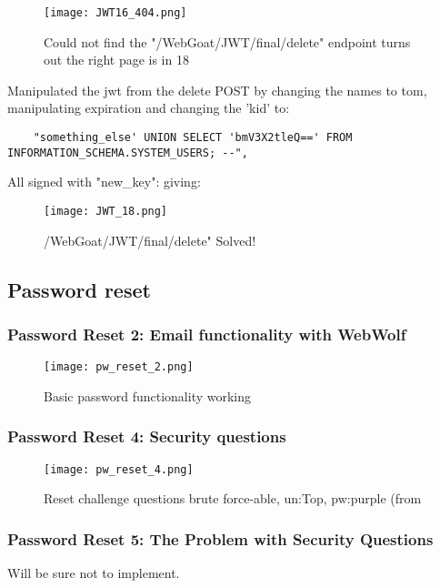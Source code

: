 \documentclass[
	letterpaper, %
	10pt, %
	unnumberedsections, %
	twoside, %
]{APAAssignment}
\begin{document}
\begin{appendices}
\begin{figure}[!ht] %
	\centering
	\texttt{[image: JWT16\_404.png]}
	\caption{Could not find the "/WebGoat/JWT/final/delete" endpoint turns out the right page is in 18}
	\label{fig:app:JWT16}
\end{figure}

Manipulated the jwt from the delete POST by changing the names to tom, manipulating expiration and changing the 'kid' to: 
\begin{verbatim}
	"something_else' UNION SELECT 'bmV3X2tleQ==' FROM INFORMATION_SCHEMA.SYSTEM_USERS; --", 
\end{verbatim}

All signed with "new\_key": giving:

\begin{figure}[!ht] %
	\centering
	\texttt{[image: JWT\_18.png]}
	\caption{/WebGoat/JWT/final/delete" Solved!}
	\label{fig:app:JWT18}
\end{figure}

\subsection{Password reset}\label{app:pwReset}

\subsubsection{Password Reset 2: Email functionality with WebWolf}

\begin{figure}[!ht] %
	\centering
	\texttt{[image: pw\_reset\_2.png]}
	\caption{Basic password functionality working}
	\label{fig:app:pw_reset_2}
\end{figure}

\subsubsection{Password Reset 4: Security questions}

\begin{figure}[!ht] %
	\centering
	\texttt{[image: pw\_reset\_4.png]}
	\caption{Reset challenge questions brute force-able, un:Top, pw:purple (from \cite{CycubicsDocsWebGoat}}
	\label{fig:app:pw_reset_4}
\end{figure}

\subsubsection{Password Reset 5: The Problem with Security Questions}
Will be sure not to implement.



\end{appendices}
\end{document}
